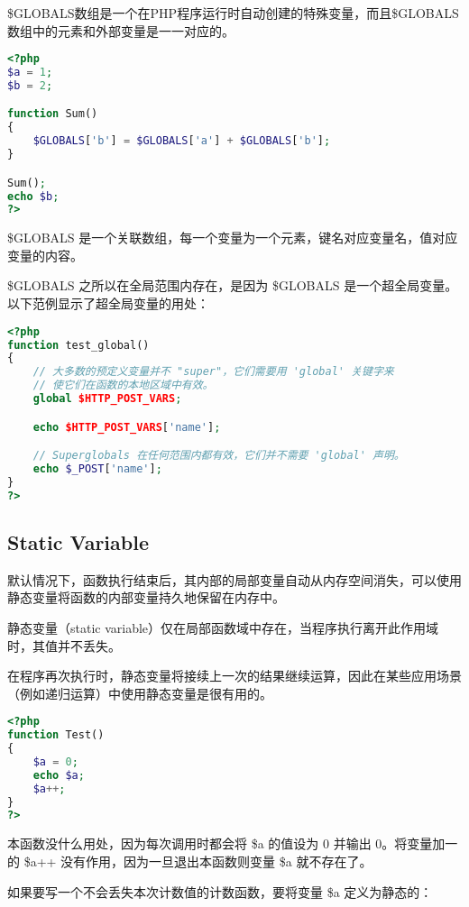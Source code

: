 \$GLOBALS数组是一个在PHP程序运行时自动创建的特殊变量，而且\$GLOBALS数组中的元素和外部变量是一一对应的。



\begin{lstlisting}[language=PHP]
<?php
$a = 1;
$b = 2;

function Sum()
{
    $GLOBALS['b'] = $GLOBALS['a'] + $GLOBALS['b'];
}

Sum();
echo $b;
?>
\end{lstlisting}

\$GLOBALS 是一个关联数组，每一个变量为一个元素，键名对应变量名，值对应变量的内容。

\$GLOBALS 之所以在全局范围内存在，是因为 \$GLOBALS 是一个超全局变量。以下范例显示了超全局变量的用处：


\begin{lstlisting}[language=PHP]
<?php
function test_global()
{
    // 大多数的预定义变量并不 "super"，它们需要用 'global' 关键字来
    // 使它们在函数的本地区域中有效。
    global $HTTP_POST_VARS;

    echo $HTTP_POST_VARS['name'];

    // Superglobals 在任何范围内都有效，它们并不需要 'global' 声明。
    echo $_POST['name'];
}
?>
\end{lstlisting}

\subsection{Static Variable}


默认情况下，函数执行结束后，其内部的局部变量自动从内存空间消失，可以使用静态变量将函数的内部变量持久地保留在内存中。

静态变量（static variable）仅在局部函数域中存在，当程序执行离开此作用域时，其值并不丢失。

在程序再次执行时，静态变量将接续上一次的结果继续运算，因此在某些应用场景（例如递归运算）中使用静态变量是很有用的。



\begin{lstlisting}[language=PHP]
<?php
function Test()
{
    $a = 0;
    echo $a;
    $a++;
}
?>
\end{lstlisting}

本函数没什么用处，因为每次调用时都会将 \$a 的值设为 0 并输出 0。将变量加一的 \$a++ 没有作用，因为一旦退出本函数则变量 \$a 就不存在了。

如果要写一个不会丢失本次计数值的计数函数，要将变量 \$a 定义为静态的：


